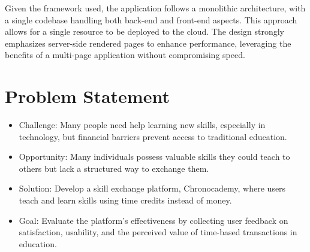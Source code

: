 Given the framework used, the application follows a monolithic architecture, with a single codebase handling both back-end and front-end aspects.
This approach allows for a single resource to be deployed to the cloud.
The design strongly emphasizes server-side rendered pages to enhance performance, leveraging the benefits of a multi-page application without compromising speed.

\section{Problem Statement}\label{sec:problem-statement}
\begin{itemize}
    \item Challenge: Many people need help learning new skills, especially in technology, but financial barriers prevent access to traditional education.
    \item Opportunity: Many individuals possess valuable skills they could teach to others but lack a structured way to exchange them.
    \item Solution: Develop a skill exchange platform, Chronocademy, where users teach and learn skills using time credits instead of money.
    \item Goal: Evaluate the platform's effectiveness by collecting user feedback on satisfaction, usability, and the perceived value of time-based transactions in education.
\end{itemize}
